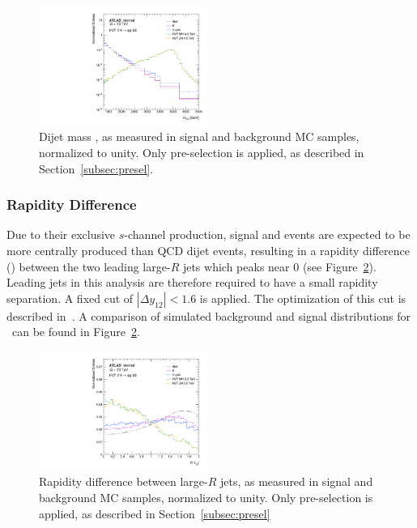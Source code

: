 \begin{figure}[htbp!]
\begin{center}
    \includegraphics[width=0.49\textwidth]{VHqqbb_SimpleSigBkgMC_mVH.pdf}
\end{center}
\caption{Dijet mass \mvh, as measured in signal and background MC samples, normalized to unity.
Only pre-selection is applied, as described in Section~\ref{subsec:presel}.}
\label{fig:simple_mc_mVH}
\end{figure}

\subsubsection{Rapidity Difference}
Due to their exclusive $s$-channel production, signal \wpwh and \zpzh events are expected to be more centrally produced than QCD dijet events, resulting in a rapidity difference () between the two leading large-$R$ jets which peaks near 0 (see Figure~\ref{fig:simple_mc_rapidity}).
Leading jets in this analysis are therefore required to have a small rapidity separation. A fixed cut of $|\Delta{y}_{12}|<1.6$ is applied.
The optimization of this cut is described in~\cite{ATL-COM-PHYS-2016-482,Summer2017}.
A comparison of simulated background and signal distributions for \ can be found in Figure~\ref{fig:simple_mc_rapidity}.

\begin{figure}[htbp!]
\begin{center}
    \includegraphics[width=0.49\textwidth]{VHqqbb_SimpleSigBkgMC_dyVH.pdf}
\end{center}
\caption{Rapidity difference between large-$R$ jets, as measured in signal and background MC samples, normalized to unity. Only pre-selection is applied, as described in Section~\ref{subsec:presel} }
\label{fig:simple_mc_rapidity}
\end{figure}


